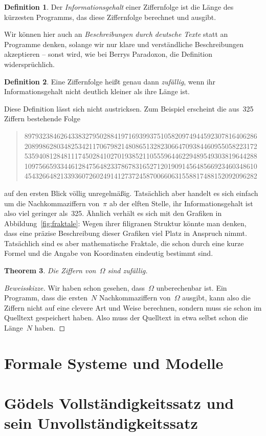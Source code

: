 \documentclass[twoside]{../zirkelblatt1415}
\theoremstyle{definition}
\newtheorem{defn}{Definition}[section]
\theoremstyle{plain}
\newtheorem{thm}[defn]{Theorem}
\theoremstyle{remark}
\begin{document}
\begin{defn}Der \emph{Informationsgehalt} einer Ziffernfolge ist die Länge des
kürzesten Programms, das diese Ziffernfolge berechnet und ausgibt.\end{defn}

Wir können hier auch an \emph{Beschreibungen durch deutsche Texte} statt an
Programme denken, solange wir nur klare und verständliche Beschreibungen
akzeptieren -- sonst wird, wie bei Berrys Paradoxon, die Definition
widersprüchlich.

\begin{defn}Eine Ziffernfolge heißt genau dann \emph{zufällig}, wenn ihr
Informationsgehalt nicht deutlich kleiner als ihre Länge ist.\end{defn}

Diese Definition lässt sich nicht austricksen. Zum Beispiel erscheint die
aus~325 Ziffern bestehende Folge
\begin{quote}
89793238462643383279502884197169399375105820974944592307816406286 \\
20899862803482534211706798214808651328230664709384460955058223172 \\
53594081284811174502841027019385211055596446229489549303819644288 \\
10975665933446128475648233786783165271201909145648566923460348610 \\
45432664821339360726024914127372458700660631558817488152092096282
\end{quote}

auf den ersten Blick völlig unregelmäßig. Tatsächlich aber handelt es sich
einfach um die Nachkommaziffern von~$\pi$ ab der elften Stelle, ihr
Informationsgehalt ist also viel geringer als~325. Ähnlich verhält es sich mit
den Grafiken in Abbildung~\ref{fig:fraktale}: Wegen ihrer filigranen Struktur könnte man denken, dass
eine präzise Beschreibung dieser Grafiken viel Platz in Anspruch nimmt.
Tatsächlich sind es aber mathematische Fraktale, die schon durch eine kurze
Formel und die Angabe von Koordinaten eindeutig bestimmt sind.

\begin{thm}Die Ziffern von~$\Omega$ sind zufällig.\end{thm}
\begin{proof}[Beweisskizze]Wir haben schon gesehen, dass~$\Omega$ unberechenbar
ist. Ein Programm, dass die ersten~$N$ Nachkommaziffern von~$\Omega$ ausgibt,
kann also die Ziffern nicht auf eine clevere Art und Weise berechnen, sondern
muss sie schon im Quelltext gespeichert haben. Also muss der Quelltext in etwa
selbst schon die Länge~$N$ haben.
\end{proof}


\section{Formale Systeme und Modelle}

\section{Gödels Vollständigkeitssatz und sein Unvollständigkeitssatz}
\end{document}

